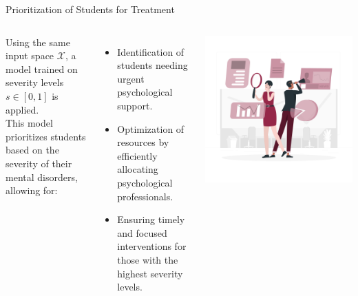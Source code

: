 \documentclass[10pt, xcolor=table]{beamer}
\let\olditem\item
\renewcommand\item{\olditem\justifying}
\begin{document}
\begin{frame}{Prioritization of Students for Treatment}
	
	\begin{columns}[c]
		\justifying
		Using the same input space \( \mathcal{X}\), a model trained on severity levels \( s \in [0, 1] \) is applied. \\
		\vspace{0.3cm}
		This model prioritizes students based on the severity of their mental disorders, allowing for:
		\begin{itemize}
			\item Identification of students needing urgent psychological support.
			\item Optimization of resources by efficiently allocating psychological professionals.
			\item Ensuring timely and focused interventions for those with the highest severity levels.
		\end{itemize}
		
		\centering
		\vspace{-0.3cm}
		\includegraphics[width=\linewidth]{./figures/priorizing.png}
	\end{columns}
	
\end{frame}
\end{document}
